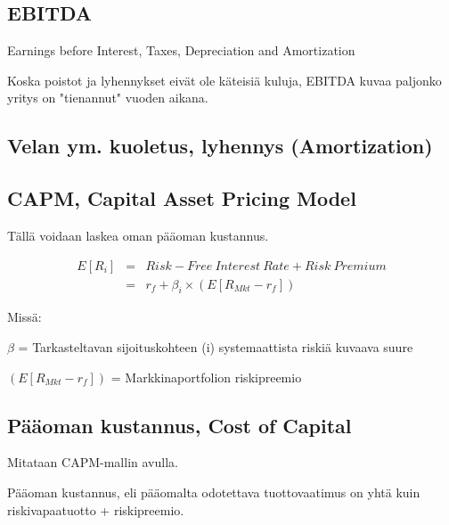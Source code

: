 \documentclass[a4paper]{article}
\begin{document}
\subsection{EBITDA}

Earnings before Interest, Taxes, Depreciation and Amortization

Koska poistot ja lyhennykset eivät ole käteisiä kuluja, EBITDA kuvaa paljonko yritys on "tienannut" vuoden aikana.

\subsection{Velan ym. kuoletus, lyhennys (Amortization)}



\subsection{CAPM, Capital Asset Pricing Model}

Tällä voidaan laskea oman pääoman kustannus.

\[
\begin{array}{lcl}
E[R_i] & = & Risk-Free\ Interest\ Rate + Risk\ Premium \\
 & = & r_f + \beta_i \times ( E [R_{Mkt} - r_f] )
\end{array}
\]

Missä:

$\beta$ = Tarkasteltavan sijoituskohteen (i) systemaattista riskiä kuvaava suure

$( E [R_{Mkt} - r_f] )$ = Markkinaportfolion riskipreemio

\subsection{Pääoman kustannus, Cost of Capital}

Mitataan CAPM-mallin avulla. 

Pääoman kustannus, eli pääomalta odotettava tuottovaatimus on yhtä kuin riskivapaatuotto + riskipreemio.
\end{document}
